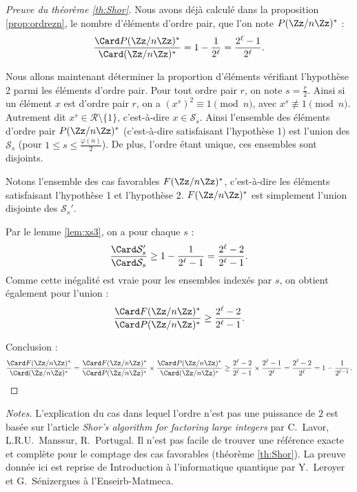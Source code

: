 \documentclass[11pt,class=report,crop=false]{standalone}
\begin{document}
\begin{proof}[Preuve du théorème \ref{th:Shor}]

Nous avons déjà calculé dans la proposition \ref{prop:ordrezn}, le nombre d'éléments d'ordre pair, que l'on note $P(\Zz/n\Zz)^*$ :
$$\frac{\Card P(\Zz/n\Zz)^*}{\Card (\Zz/n\Zz)^*} = 1-\frac{1}{2^\ell} = \frac{2^\ell-1}{2^\ell}.$$

Nous allons maintenant déterminer la proportion d'éléments vérifiant l'hypothèse 2 parmi les éléments d'ordre pair.
Pour tout ordre pair $r$, on note $s=\frac{r}{2}$. Ainsi si un élément $x$ est d'ordre pair $r$, on a $(x^s)^2 \equiv 1 \pmod n$, avec $x^s \not\equiv 1 \pmod n$. Autrement dit $x^s \in \mathcal{R} \setminus \{1\}$, c'est-à-dire $x \in \mathcal{S}_s$. Ainsi l'ensemble des éléments d'ordre pair $P(\Zz/n\Zz)^*$ (c'est-à-dire satisfaisant l'hypothèse 1) est l'union des $\mathcal{S}_s$ (pour $1 \le s \le \frac{\varphi(n)}{2}$). 
De plus, l'ordre étant unique, ces ensembles sont disjoints.

Notons l'ensemble des cas favorables $F(\Zz/n\Zz)^*$, c'est-à-dire les éléments satisfaisant l'hypothèse 1 et l'hypothèse 2.
$F(\Zz/n\Zz)^*$ est simplement l'union disjointe des $\mathcal{S}_s'$.

Par le lemme \ref{lem:xs3}, on a pour chaque $s$ :
$$\frac{\Card \mathcal{S}_s'}{\Card \mathcal{S}_s} 
\ge 1-\frac{1}{2^\ell-1}
= \frac{2^\ell-2}{2^\ell-1}.$$
Comme cette inégalité est vraie pour les ensembles indexés par $s$, on obtient également pour l'union :
$$\frac{\Card F(\Zz/n\Zz)^*}{\Card P(\Zz/n\Zz)^*} \ge \frac{2^\ell-2}{2^\ell-1}.$$


Conclusion :
$$\frac{\Card F(\Zz/n\Zz)^*}{\Card (\Zz/n\Zz)^*}
= 
\frac{\Card F(\Zz/n\Zz)^*}{\Card P(\Zz/n\Zz)^*}
\times 
\frac{\Card P(\Zz/n\Zz)^*}{\Card (\Zz/n\Zz)^*}
\ge \frac{2^\ell-2}{2^\ell-1} \times \frac{2^\ell-1}{2^\ell}
=  \frac{2^\ell-2}{2^\ell} = 1 - \frac1{2^{\ell-1}}.$$
\end{proof}


\bigskip
\bigskip

\emph{Notes.} 
L'explication du cas dans lequel l'ordre n'est pas une puissance de $2$ est basée sur l'article \emph{Shor’s algorithm for factoring large integers} par C.~Lavor, L.R.U.~Manssur, R.~Portugal.
Il n'est pas facile de trouver une référence exacte et complète pour le comptage des cas favorables (théorème \ref{th:Shor}). La preuve donnée ici est reprise de \og{}Introduction à l'informatique quantique\fg{} par Y.~Leroyer et G.~Sénizergues
à l'Enseirb-Matmeca.
\end{document}
